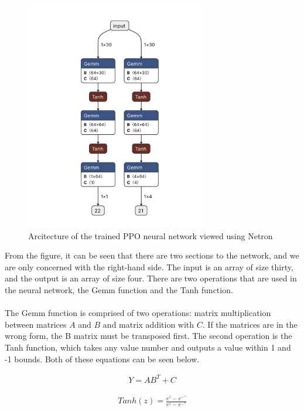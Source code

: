 \documentclass[a4paper,12pt]{article}
\begin{document}
\begin{figure}[H]
\centering{}
\includegraphics[width=8cm]{imgs/HistoryNetron.png}
\caption{Arcitecture of the trained PPO neural network viewed using Netron}
\label{fig:HistoryNetron}
\end{figure}
\noindent
From the figure, it can be seen that there are two sections to the network, and we are only concerned with the right-hand side. The input is an array of size thirty, and the output is an array of size four. There are two operations that are used in the neural network, the Gemm function and the Tanh function. 
\\\\
The Gemm function is comprised of two operations: matrix multiplication between matrices $A$ and $B$ and matrix addition with $C$. If the matrices are in the wrong form, the B matrix must be transposed first. The second operation is the Tanh function, which takes any value number and outputs a value within 1 and -1 bounds. Both of these equations can be seen below. 

\begin{equation}
\begin{aligned}
Y = AB^T + C
\end{aligned}
\end{equation}


\begin{equation}
\begin{aligned}
Tanh(z) = \frac{e^z-e^-^z}{e^z-e^-^z}
\end{aligned}
\end{equation}
\end{document}
